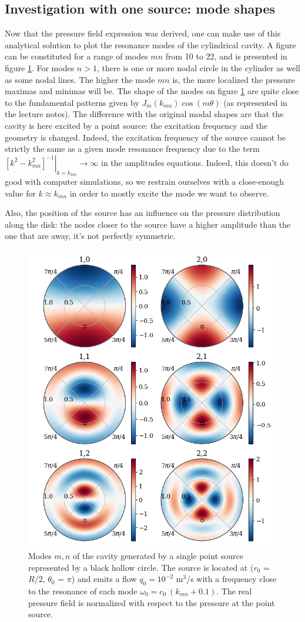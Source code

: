 \documentclass[%
 reprint,
 amsmath,amssymb,
 aps,
]{revtex4-2}
\begin{document}
\subsection{Investigation with one source: mode shapes}
Now that the pressure field expression was derived, one can make use of this analytical solution to plot the resonance modes of the cylindrical cavity. A figure can be constituted for a range of modes $mn$ from 10 to 22, and is presented in figure \ref{fig:modes}. For modes $n>1$, there is one or more nodal circle in the cylinder as well as some nodal lines. The higher the mode $mn$ is, the more localized the pressure maximas and minimas will be. The shape of the modes on figure \ref{fig:modes} are quite close to the fundamental patterns given by $J_m(k_{mn})\cos(m\theta)$ (as represented in the lecture notes). The difference with the original modal shapes are that the cavity is here excited by a point source: the excitation frequency and the geometry is changed. Indeed, the excitation frequency of the source cannot be strictly the same as a given mode resonance frequency due to the term $\left.\left[k^2 - k^2_{mn}\right]^{-1}\right|_{k = k_{mn}} \longrightarrow \infty$ in the amplitudes equations. Indeed, this doesn't do good with computer simulations, so we restrain ourselves with a close-enough value for $k \approx k_{mn}$ in order to mostly excite the mode we want to observe.

Also, the position of the source has an influence on the pressure distribution along the disk: the nodes closer to the source have a higher amplitude than the one that are away, it's not perfectly symmetric. 

\begin{figure}[t]
    \centering
    \includegraphics[width=.5\textwidth]{figures/modes.png}
    \caption{Modes $m,n$ of the cavity generated by a single point source represented by a black hollow circle. The source is located at ($r_0$ = $R/2$, $\theta_0$ = $\pi$) and emits a flow $q_0 = 10^{-2}$ m$^3$/s with a frequency close to the resonance of each mode $\omega_0 = c_0 \: (k_{mn} + 0.1)$. The real pressure field is normalized with respect to the pressure at the point source.}
    \label{fig:modes}
\end{figure}
\end{document}
